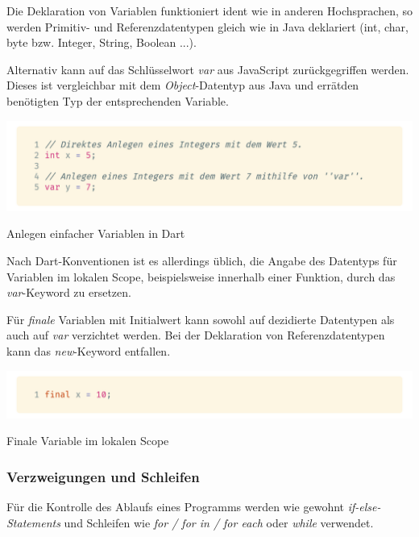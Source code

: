 Die Deklaration von Variablen funktioniert ident wie in anderen Hochsprachen, so werden Primitiv- und Referenzdatentypen gleich wie in Java deklariert (int, char, byte bzw. Integer, String, Boolean ...).

Alternativ kann auf das Schlüsselwort \textit{var} aus JavaScript zurückgegriffen werden. Dieses ist vergleichbar mit dem \textit{Object}-Datentyp aus Java und \glqq errät\grqq\space den benötigten Typ der entsprechenden Variable.

\begin{code}[H]
    \centering
    \includegraphics[width=1\textwidth]{images/Dart/theory/dartVariables.png}
    \vspace{-25pt}
    \caption{Anlegen einfacher Variablen in Dart}
\end{code}

Nach Dart-Konventionen ist es allerdings üblich, die Angabe des Datentyps für Variablen im lokalen Scope, beispielsweise innerhalb einer Funktion, durch das \textit{var}-Keyword zu ersetzen. \cite{dartdesignvariables2021}

Für \textit{finale} Variablen mit Initialwert kann sowohl auf dezidierte Datentypen als auch auf \textit{var} verzichtet werden. Bei der Deklaration von Referenzdatentypen kann das \textit{new}-Keyword entfallen.

\begin{code}[H]
    \centering
    \includegraphics[width=1\textwidth]{images/Dart/theory/dartLocalFinal.png}
    \vspace{-25pt}
    \caption{Finale Variable im lokalen Scope}
\end{code}

\newpage

\subsubsection{Verzweigungen und Schleifen}

Für die Kontrolle des Ablaufs eines Programms werden wie gewohnt \textit{if-else-Statements} und Schleifen
wie \textit{for / for in / for each} oder \textit{while} verwendet.

